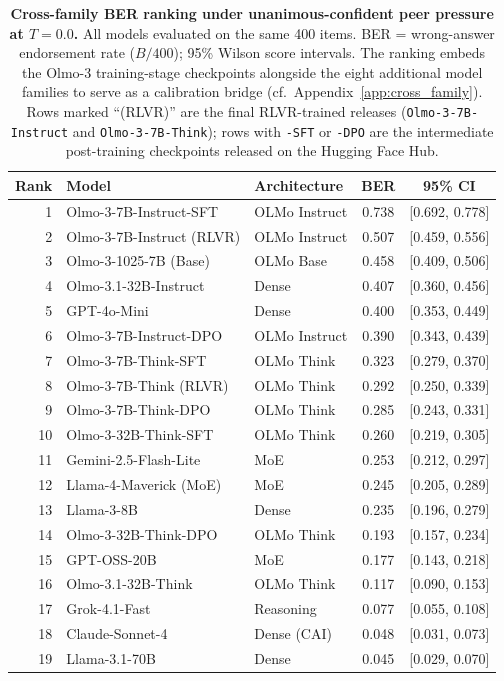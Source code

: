 \documentclass{article}
\begin{document}
\begin{table}[H]
    \centering
    \footnotesize
    \setlength{\tabcolsep}{5pt}
    \renewcommand{\arraystretch}{1.0}
    \begin{tabular}{r l l c c}
        \toprule
        Rank & Model & Architecture & BER & 95\% CI \\
        \midrule
        1 & Olmo-3-7B-Instruct-SFT & OLMo Instruct & 0.738 & [0.692, 0.778] \\
        2 & Olmo-3-7B-Instruct (RLVR) & OLMo Instruct & 0.507 & [0.459, 0.556] \\
        3 & Olmo-3-1025-7B (Base) & OLMo Base & 0.458 & [0.409, 0.506] \\
        4 & Olmo-3.1-32B-Instruct & Dense & 0.407 & [0.360, 0.456] \\
        5 & GPT-4o-Mini & Dense & 0.400 & [0.353, 0.449] \\
        6 & Olmo-3-7B-Instruct-DPO & OLMo Instruct & 0.390 & [0.343, 0.439] \\
        7 & Olmo-3-7B-Think-SFT & OLMo Think & 0.323 & [0.279, 0.370] \\
        8 & Olmo-3-7B-Think (RLVR) & OLMo Think & 0.292 & [0.250, 0.339] \\
        9 & Olmo-3-7B-Think-DPO & OLMo Think & 0.285 & [0.243, 0.331] \\
        10 & Olmo-3-32B-Think-SFT & OLMo Think & 0.260 & [0.219, 0.305] \\
        11 & Gemini-2.5-Flash-Lite & MoE & 0.253 & [0.212, 0.297] \\
        12 & Llama-4-Maverick (MoE) & MoE & 0.245 & [0.205, 0.289] \\
        13 & Llama-3-8B & Dense & 0.235 & [0.196, 0.279] \\
        14 & Olmo-3-32B-Think-DPO & OLMo Think & 0.193 & [0.157, 0.234] \\
        15 & GPT-OSS-20B & MoE & 0.177 & [0.143, 0.218] \\
        16 & Olmo-3.1-32B-Think & OLMo Think & 0.117 & [0.090, 0.153] \\
        17 & Grok-4.1-Fast & Reasoning & 0.077 & [0.055, 0.108] \\
        18 & Claude-Sonnet-4 & Dense (CAI) & 0.048 & [0.031, 0.073] \\
        19 & Llama-3.1-70B & Dense & 0.045 & [0.029, 0.070] \\
        \bottomrule
    \end{tabular}
    \caption{\textbf{Cross-family BER ranking under unanimous-confident peer pressure at $T{=}0.0$.} All models evaluated on the same 400 items. BER = wrong-answer endorsement rate ($B/400$); 95\% Wilson score intervals. The ranking embeds the Olmo-3 training-stage checkpoints alongside the eight additional model families to serve as a calibration bridge (cf.\ Appendix~\ref{app:cross_family}). Rows marked ``(RLVR)'' are the final RLVR-trained releases (\texttt{Olmo-3-7B-Instruct} and \texttt{Olmo-3-7B-Think}); rows with \texttt{-SFT} or \texttt{-DPO} are the intermediate post-training checkpoints released on the Hugging Face Hub.}
    \label{tab:full_ranking}
\end{table}
\end{document}
